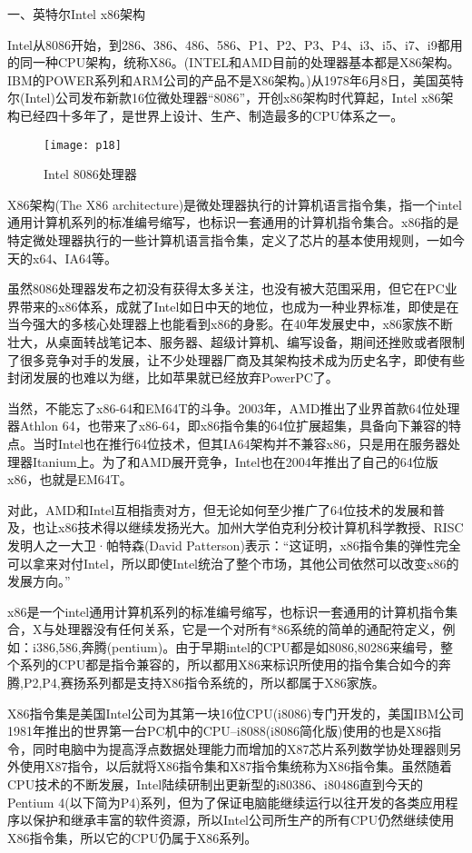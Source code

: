 \documentclass[utf8]{book}
\begin{document}
	一、英特尔Intel x86架构
	
	Intel从8086开始，到286、386、486、586、P1、P2、P3、P4、i3、i5、i7、i9都用的同一种CPU架构，统称X86。(INTEL和AMD目前的处理器基本都是X86架构。IBM的POWER系列和ARM公司的产品不是X86架构。)从1978年6月8日，美国英特尔(Intel)公司发布新款16位微处理器“8086”，开创x86架构时代算起，Intel x86架构已经四十多年了，是世界上设计、生产、制造最多的CPU体系之一。
	\begin{figure}[H]
		\centering
		\texttt{[image: p18]}
		\caption{Intel 8086处理器}
	\end{figure}
	
	X86架构(The X86 architecture)是微处理器执行的计算机语言指令集，指一个intel通用计算机系列的标准编号缩写，也标识一套通用的计算机指令集合。x86指的是特定微处理器执行的一些计算机语言指令集，定义了芯片的基本使用规则，一如今天的x64、IA64等。
	
	虽然8086处理器发布之初没有获得太多关注，也没有被大范围采用，但它在PC业界带来的x86体系，成就了Intel如日中天的地位，也成为一种业界标准，即使是在当今强大的多核心处理器上也能看到x86的身影。在40年发展史中，x86家族不断壮大，从桌面转战笔记本、服务器、超级计算机、编写设备，期间还挫败或者限制了很多竞争对手的发展，让不少处理器厂商及其架构技术成为历史名字，即使有些封闭发展的也难以为继，比如苹果就已经放弃PowerPC了。
	
	当然，不能忘了x86-64和EM64T的斗争。2003年，AMD推出了业界首款64位处理器Athlon 64，也带来了x86-64，即x86指令集的64位扩展超集，具备向下兼容的特点。当时Intel也在推行64位技术，但其IA64架构并不兼容x86，只是用在服务器处理器Itanium上。为了和AMD展开竞争，Intel也在2004年推出了自己的64位版x86，也就是EM64T。
	
	对此，AMD和Intel互相指责对方，但无论如何至少推广了64位技术的发展和普及，也让x86技术得以继续发扬光大。加州大学伯克利分校计算机科学教授、RISC发明人之一大卫·帕特森(David Patterson)表示：“这证明，x86指令集的弹性完全可以拿来对付Intel，所以即使Intel统治了整个市场，其他公司依然可以改变x86的发展方向。”
	
	x86是一个intel通用计算机系列的标准编号缩写，也标识一套通用的计算机指令集合，X与处理器没有任何关系，它是一个对所有*86系统的简单的通配符定义，例如：i386,586,奔腾(pentium)。由于早期intel的CPU都是如8086,80286来编号，整个系列的CPU都是指令兼容的，所以都用X86来标识所使用的指令集合如今的奔腾,P2,P4,赛扬系列都是支持X86指令系统的，所以都属于X86家族。
	
	X86指令集是美国Intel公司为其第一块16位CPU(i8086)专门开发的，美国IBM公司1981年推出的世界第一台PC机中的CPU--i8088(i8086简化版)使用的也是X86指令，同时电脑中为提高浮点数据处理能力而增加的X87芯片系列数学协处理器则另外使用X87指令，以后就将X86指令集和X87指令集统称为X86指令集。虽然随着CPU技术的不断发展，Intel陆续研制出更新型的i80386、i80486直到今天的Pentium 4(以下简为P4)系列，但为了保证电脑能继续运行以往开发的各类应用程序以保护和继承丰富的软件资源，所以Intel公司所生产的所有CPU仍然继续使用X86指令集，所以它的CPU仍属于X86系列。
	
\end{document}
